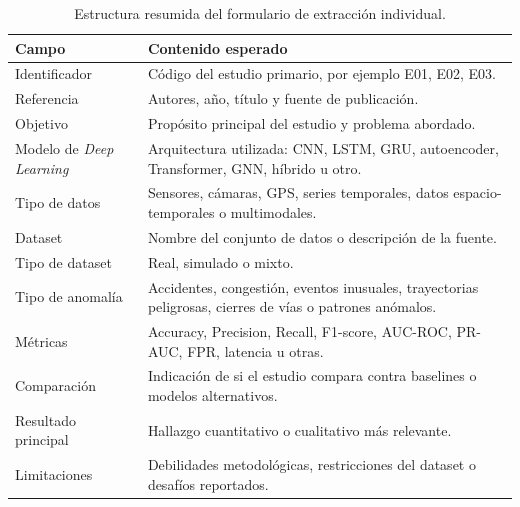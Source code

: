 \documentclass[12pt, a4paper]{article}
\begin{document}
\begin{table}[H]
\centering
\caption{Estructura resumida del formulario de extracci\'{o}n individual.}
\label{tab:ap_formulario}
\begin{tabularx}{\linewidth}{p{4cm}X}
\toprule
\textbf{Campo} & \textbf{Contenido esperado} \\
\midrule
Identificador & C\'{o}digo del estudio primario, por ejemplo E01, E02, E03. \\
Referencia & Autores, a\~{n}o, t\'{i}tulo y fuente de publicaci\'{o}n. \\
Objetivo & Prop\'{o}sito principal del estudio y problema abordado. \\
Modelo de \textit{Deep Learning} & Arquitectura utilizada: CNN, LSTM, GRU, autoencoder, Transformer, GNN, h\'{i}brido u otro. \\
Tipo de datos & Sensores, c\'{a}maras, GPS, series temporales, datos espacio-temporales o multimodales. \\
Dataset & Nombre del conjunto de datos o descripci\'{o}n de la fuente. \\
Tipo de dataset & Real, simulado o mixto. \\
Tipo de anomal\'{i}a & Accidentes, congesti\'{o}n, eventos inusuales, trayectorias peligrosas, cierres de v\'{i}as o patrones an\'{o}malos. \\
M\'{e}tricas & Accuracy, Precision, Recall, F1-score, AUC-ROC, PR-AUC, FPR, latencia u otras. \\
Comparaci\'{o}n & Indicaci\'{o}n de si el estudio compara contra baselines o modelos alternativos. \\
Resultado principal & Hallazgo cuantitativo o cualitativo m\'{a}s relevante. \\
Limitaciones & Debilidades metodol\'{o}gicas, restricciones del dataset o desaf\'{i}os reportados. \\
\bottomrule
\end{tabularx}
\end{table}
\end{document}
